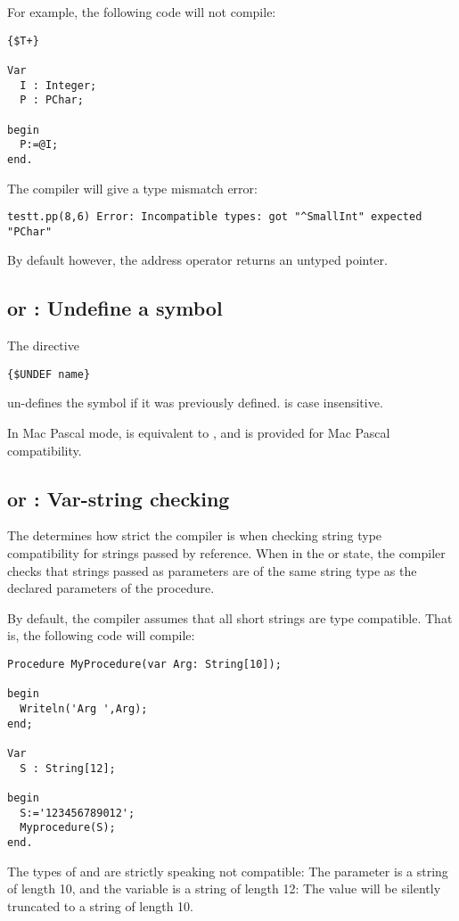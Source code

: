 For example, the following code will not compile:
\begin{verbatim}
{$T+}

Var
  I : Integer;
  P : PChar;

begin
  P:=@I;
end.
\end{verbatim}
The compiler will give a type mismatch error:
\begin{verbatim}
testt.pp(8,6) Error: Incompatible types: got "^SmallInt" expected "PChar"
\end{verbatim}

By default however, the address operator returns an untyped pointer.

\subsection{ or  : Undefine a symbol}

The directive
\begin{verbatim}
{$UNDEF name}
\end{verbatim}
un-defines the symbol  if it was previously defined.
 is case insensitive.

In Mac Pascal mode,  is equivalent to , and is 
provided for Mac Pascal compatibility.


\subsection{ or  : Var-string checking}

The  determines how strict the compiler is when 
checking string type compatibility for strings passed by reference. When in the \var{+} or  state, 
the compiler checks that strings passed as parameters are of the same string type as the declared
parameters of the procedure.

By default, the compiler assumes that all short strings are type compatible.
That is, the following code will compile:
\begin{verbatim}
Procedure MyProcedure(var Arg: String[10]);

begin
  Writeln('Arg ',Arg);
end;

Var
  S : String[12];

begin
  S:='123456789012';
  Myprocedure(S);
end.
\end{verbatim}
The types of  and  are strictly speaking not compatible:
The  parameter is a string of length 10, and the variable 
is a string of length 12: The value will be silently truncated to a string
of length 10.

